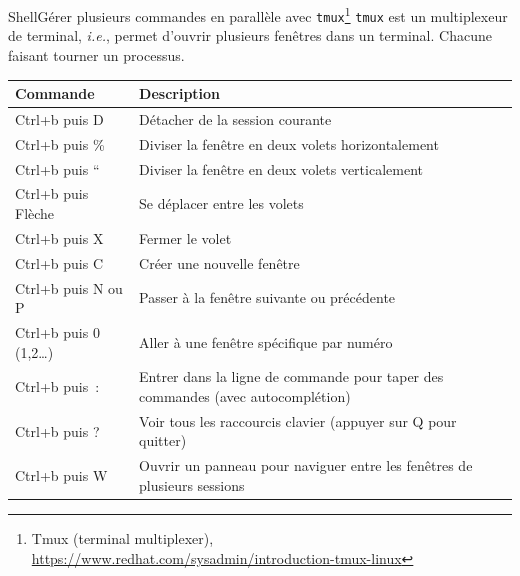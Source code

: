 \documentclass{beamer}
\begin{document}
    \begin{frame}{Shell}{Gérer plusieurs commandes en parallèle avec \lstinline{tmux}\footnote{\label{itm:tmux}Tmux (terminal multiplexer), \url{https://www.redhat.com/sysadmin/introduction-tmux-linux}}}
        \lstinline{tmux} est un multiplexeur de terminal, \textit{i.e.}, permet d'ouvrir plusieurs fenêtres dans un terminal.
        Chacune faisant tourner un processus.
        \begin{footnotesize}
            \begin{table}[ht]
                \centering
                \begin{tabular}{|p{3.5cm}|p{8cm}|}
                    \hline
                    \textbf{Commande}         & \textbf{Description}                                                            \\
                    \hline
                    Ctrl+b puis D             & Détacher de la session courante                                                 \\
                    \hline
                    Ctrl+b puis \%            & Diviser la fenêtre en deux volets horizontalement                               \\
                    \hline
                    Ctrl+b puis ``            & Diviser la fenêtre en deux volets verticalement                                 \\
                    \hline
                    Ctrl+b puis Flèche        & Se déplacer entre les volets                                                    \\
                    \hline
                    Ctrl+b puis X             & Fermer le volet                                                                 \\
                    \hline
                    Ctrl+b puis C             & Créer une nouvelle fenêtre                                                      \\
                    \hline
                    Ctrl+b puis N ou P        & Passer à la fenêtre suivante ou précédente                                      \\
                    \hline
                    Ctrl+b puis 0 (1,2\ldots) & Aller à une fenêtre spécifique par numéro                                       \\
                    \hline
                    Ctrl+b puis~:             & Entrer dans la ligne de commande pour taper des commandes (avec autocomplétion) \\
                    \hline
                    Ctrl+b puis ?             & Voir tous les raccourcis clavier (appuyer sur Q pour quitter)                   \\
                    \hline
                    Ctrl+b puis W             & Ouvrir un panneau pour naviguer entre les fenêtres de plusieurs sessions        \\
                    \hline
                \end{tabular}
            \end{table}
        \end{footnotesize}
    \end{frame}
\end{document}
